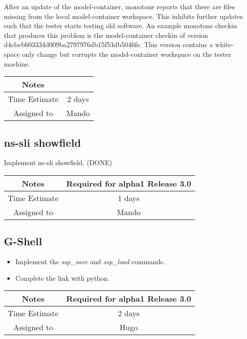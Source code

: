 \documentclass[12pt]{article}
\begin{document}
After an update of the model-container, monotone reports that there
are files missing from the local model-container workspace.  This
inhibits further updates such that the tester starts testing old
software.  An example monotone checkin that produces this problem is
the model-container checkin of version
d4cbeb603334d009ba2797976db15f53db5046fe.  This version contains a
white-space only change but corrupts the model-container workspace on
the tester machine.

{
  \vspace{5mm}
  \centering
  \begin{tabular}{|c|c|}
    \hline
    Notes
    & \\
    \hline
    Time Estimate
    & 2 days \\
    \hline
    Assigned to
    & Mando \\
    \hline
  \end{tabular}
}


\subsection{ns-sli showfield}

Implement ns-sli showfield. (DONE)

{
  \vspace{5mm}
  \centering
  \begin{tabular}{|c|c|}
    \hline
    Notes
    & Required for alpha1 Release 3.0 \\
    \hline
    Time Estimate
    & 1 days \\
    \hline
    Assigned to
    & Mando \\
    \hline
  \end{tabular}
}


\subsection{G-Shell}
\begin{itemize}
\item Implement the {\it ssp\_save} and {\it ssp\_load} commands.
\item Complete the link with python.
\end{itemize}

{
  \vspace{5mm}
  \centering
  \begin{tabular}{|c|c|}
    \hline
    Notes
    & Required for alpha1 Release 3.0 \\
    \hline
    Time Estimate
    & 2 days \\
    \hline
    Assigned to
    & Hugo \\
    \hline
  \end{tabular}
}
\end{document}
